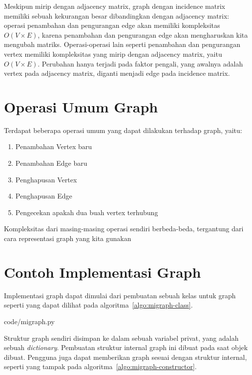 Meskipun mirip dengan adjacency matrix, graph dengan incidence matrix memiliki sebuah kekurangan besar dibandingkan dengan adjacency matrix: operasi penambahan dan pengurangan edge akan memiliki kompleksitas $O(V \times E)$, karena penambahan dan pengurangan edge akan mengharuskan kita mengubah matriks. Operasi-operasi lain seperti penambahan dan pengurangan vertex memiliki kompleksitas yang mirip dengan adjacency matrix, yaitu $O(V \times E)$. Perubahan hanya terjadi pada faktor pengali, yang awalnya adalah vertex pada adjacency matrix, diganti menjadi edge pada incidence matrix.

\section{Operasi Umum Graph}

Terdapat beberapa operasi umum yang dapat dilakukan terhadap graph, yaitu:

\begin{enumerate}
    \item Penambahan Vertex baru
    \item Penambahan Edge baru
    \item Penghapusan Vertex
    \item Penghapusan Edge
    \item Pengecekan apakah dua buah vertex terhubung
\end{enumerate}

Kompleksitas dari masing-masing operasi sendiri berbeda-beda, tergantung dari cara representasi graph yang kita gunakan

\section{Contoh Implementasi Graph}

Implementasi graph dapat dimulai dari pembuatan sebuah kelas untuk graph seperti yang dapat dilihat pada algoritma~\ref{algo:migraph-class}.


                {code/migraph.py}

Struktur graph sendiri disimpan ke dalam sebuah variabel privat, yang adalah sebuah \textit{dictionary}. Pembuatan struktur internal graph ini dibuat pada saat objek dibuat. Pengguna juga dapat memberikan graph sesuai dengan struktur internal, seperti yang tampak pada algoritma~\ref{algo:migraph-constructor}.

